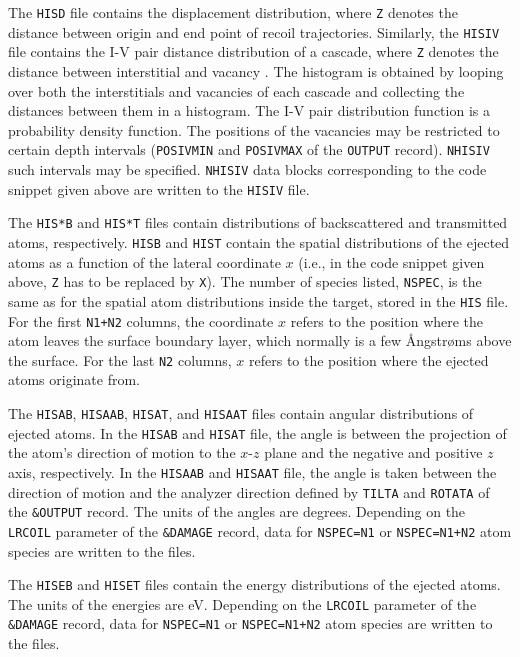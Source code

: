 The \texttt{HISD} file contains the displacement distribution, where \texttt{Z}
denotes the distance between origin and end point of recoil trajectories.
Similarly, the \texttt{HISIV} file contains the I-V pair distance distribution
of a cascade, where \texttt{Z} denotes the distance between interstitial and
vacancy \cite{hobler_continuum_1999}. The histogram is obtained by looping over
both the interstitials and vacancies of each cascade and collecting the
distances between them in a histogram. The I-V pair distribution function is a
probability density function. The positions of the vacancies may be restricted
to certain depth intervals (\texttt{POSIVMIN} and \texttt{POSIVMAX} of the
\texttt{OUTPUT} record). \texttt{NHISIV} such intervals may be specified.
\texttt{NHISIV} data blocks corresponding to the code snippet given above are
written to the \texttt{HISIV} file.  

The \texttt{HIS*B} and \texttt{HIS*T} files contain distributions of
backscattered and transmitted atoms, respectively. \texttt{HISB} and
\texttt{HIST} contain the spatial distributions of the ejected atoms as a
function of the lateral coordinate $x$ (i.e., in the code snippet given above,
\texttt{Z} has to be replaced by \texttt{X}). The number of species listed,
\texttt{NSPEC}, is the same as for the spatial atom distributions inside the
target, stored in the \texttt{HIS} file. For the first \texttt{N1+N2} columns,
the coordinate $x$ refers to the position where the atom leaves the surface
boundary layer, which normally is a few {\AA}ngstr{\o}ms above the surface. For
the last \texttt{N2} columns, $x$ refers to the position where the ejected atoms
originate from.  

The \texttt{HISAB}, \texttt{HISAAB}, \texttt{HISAT}, and \texttt{HISAAT} files
contain angular distributions of ejected atoms. In the \texttt{HISAB} and
\texttt{HISAT} file, the angle is between the projection of the atom's direction
of motion to the $x$-$z$ plane and the negative and positive $z$ axis,
respectively. In the \texttt{HISAAB} and \texttt{HISAAT} file, the angle is
taken between the direction of motion and the analyzer direction defined by
\texttt{TILTA} and \texttt{ROTATA} of the \texttt{\&OUTPUT} record. The units of
the angles are degrees. Depending on the \texttt{LRCOIL} parameter of the
\texttt{\&DAMAGE} record, data for \texttt{NSPEC=N1} or \texttt{NSPEC=N1+N2}
atom species are written to the files.  

The \texttt{HISEB} and \texttt{HISET} files contain the energy distributions of
the ejected atoms. The units of the energies are eV. Depending on the
\texttt{LRCOIL} parameter of the \texttt{\&DAMAGE} record, data for
\texttt{NSPEC=N1} or \texttt{NSPEC=N1+N2} atom species are written to the files.

